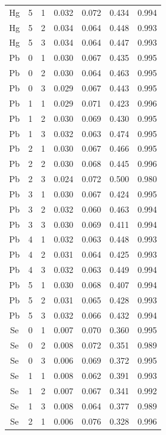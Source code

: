\documentclass[ms, hidelinks]{uncgdissertationexp}
\theoremstyle{plain}
\theoremstyle{definition}
\theoremstyle{remark}
\begin{document}
\begin{longtable}{ccccccc}
Hg & 5 & 1 & 0.032 & 0.072 & 0.434 & 0.994\\
\rowcolor{gray!6}  Hg & 5 & 2 & 0.034 & 0.064 & 0.448 & 0.993\\
Hg & 5 & 3 & 0.034 & 0.064 & 0.447 & 0.993\\
\rowcolor{gray!6}  Pb & 0 & 1 & 0.030 & 0.067 & 0.435 & 0.995\\
Pb & 0 & 2 & 0.030 & 0.064 & 0.463 & 0.995\\
\rowcolor{gray!6}  Pb & 0 & 3 & 0.029 & 0.067 & 0.443 & 0.995\\
Pb & 1 & 1 & 0.029 & 0.071 & 0.423 & 0.996\\
\rowcolor{gray!6}  Pb & 1 & 2 & 0.030 & 0.069 & 0.430 & 0.995\\
Pb & 1 & 3 & 0.032 & 0.063 & 0.474 & 0.995\\
\rowcolor{gray!6}  Pb & 2 & 1 & 0.030 & 0.067 & 0.466 & 0.995\\
Pb & 2 & 2 & 0.030 & 0.068 & 0.445 & 0.996\\
\rowcolor{gray!6}  Pb & 2 & 3 & 0.024 & 0.072 & 0.500 & 0.980\\
Pb & 3 & 1 & 0.030 & 0.067 & 0.424 & 0.995\\
\rowcolor{gray!6}  Pb & 3 & 2 & 0.032 & 0.060 & 0.463 & 0.994\\
Pb & 3 & 3 & 0.030 & 0.069 & 0.411 & 0.994\\
\rowcolor{gray!6}  Pb & 4 & 1 & 0.032 & 0.063 & 0.448 & 0.993\\
Pb & 4 & 2 & 0.031 & 0.064 & 0.425 & 0.993\\
\rowcolor{gray!6}  Pb & 4 & 3 & 0.032 & 0.063 & 0.449 & 0.994\\
Pb & 5 & 1 & 0.030 & 0.068 & 0.407 & 0.994\\
\rowcolor{gray!6}  Pb & 5 & 2 & 0.031 & 0.065 & 0.428 & 0.993\\
Pb & 5 & 3 & 0.032 & 0.066 & 0.432 & 0.994\\
\rowcolor{gray!6}  Se & 0 & 1 & 0.007 & 0.070 & 0.360 & 0.995\\
Se & 0 & 2 & 0.008 & 0.072 & 0.351 & 0.989\\
\rowcolor{gray!6}  Se & 0 & 3 & 0.006 & 0.069 & 0.372 & 0.995\\
Se & 1 & 1 & 0.008 & 0.062 & 0.391 & 0.993\\
\rowcolor{gray!6}  Se & 1 & 2 & 0.007 & 0.067 & 0.341 & 0.992\\
Se & 1 & 3 & 0.008 & 0.064 & 0.377 & 0.989\\
\rowcolor{gray!6}  Se & 2 & 1 & 0.006 & 0.076 & 0.328 & 0.996\\

\end{longtable}
\end{document}
